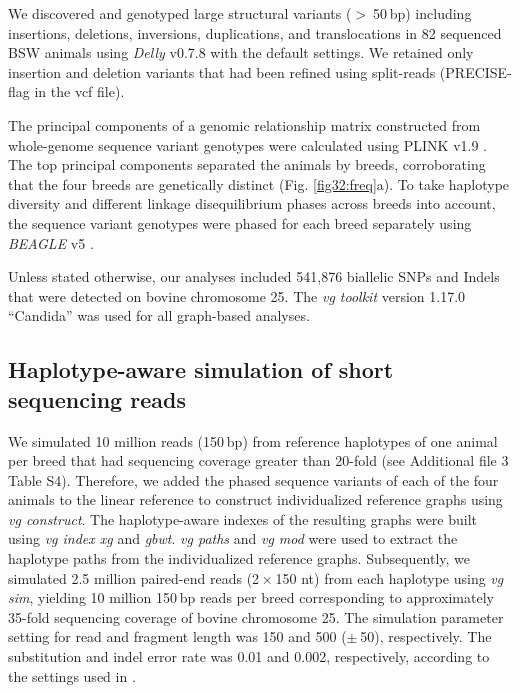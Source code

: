 \documentclass[../main.tex]{subfiles}
\begin{document}
We discovered and genotyped large structural variants ($>$ 50 bp) including insertions, deletions, inversions, duplications, and translocations in 82 sequenced BSW animals using \emph{Delly} v0.7.8 \citep{rausch2012delly} with the default settings. We retained only insertion and deletion variants that had been refined using split-reads (PRECISE-flag in the vcf file).

The principal components of a genomic relationship matrix constructed from whole-genome sequence variant genotypes were calculated using PLINK v1.9 \citep{chang2015second}. The top principal components separated the animals by breeds, corroborating that the four breeds are genetically distinct (Fig. \ref{fig32:freq}a). To take haplotype diversity and different linkage disequilibrium phases across breeds into account, the sequence variant genotypes were phased for each breed separately using \emph{BEAGLE} v5 \citep{browning2018one}.

Unless stated otherwise, our analyses included 541,876 biallelic SNPs and Indels that were detected on bovine chromosome 25. The \emph{vg toolkit} version 1.17.0 “Candida” \citep{garrison2018variation} was used for all graph-based analyses.

\subsection*{Haplotype-aware simulation of short sequencing reads}


We simulated 10 million reads (150 bp) from reference haplotypes of one animal per breed that had sequencing coverage greater than 20-fold (see Additional file 3 Table S4). Therefore, we added the phased sequence variants of each of the four animals to the linear reference to construct individualized reference graphs using \emph{vg construct}. The haplotype-aware indexes of the resulting graphs were built using \emph{vg index xg} and \emph{gbwt}. \emph{vg paths} and \emph{vg mod} were used to extract the haplotype paths from the individualized reference graphs. Subsequently, we simulated 2.5 million paired-end reads (2 × 150 nt) from each haplotype using \emph{vg sim}, yielding 10 million 150 bp reads per breed corresponding to approximately 35-fold sequencing coverage of bovine chromosome 25. The simulation parameter setting for read and fragment length was 150 and 500 ($\pm$ 50), respectively. The substitution and indel error rate was 0.01 and 0.002, respectively, according to the settings used in \citep{garrison2018variation}.
\end{document}
